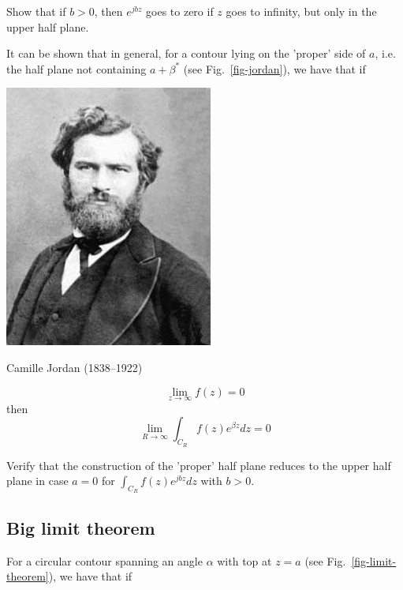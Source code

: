 \begin{cue}
Show that if $b>0$, then $e^{jbz}$ goes to zero if $z$ goes to infinity, but only in the upper half plane.
\end{cue}

It can be shown that in general, for a contour lying on the 'proper' side of $a$, i.e. the half plane not containing $a+\beta^*$ (see Fig.~\ref{fig-jordan}), we have that if

\begin{marginfigure}[-2.5cm]
  \includegraphics{complex/figures/camille_jordan}
  \caption{Camille Jordan (1838–1922) }
\end{marginfigure}

\begin{equation}
\lim_{z \to \infty} f(z) = 0
\end{equation}
then
\begin{equation}
\lim_{R \to \infty} \int_{{C}_R} f(z) e^{\beta z} dz = 0
\end{equation}

\begin{cue}
Verify that the construction of the 'proper' half plane reduces to the upper half plane in case $a=0$ for $ \int_{{C}_R} f(z) e^{jb z} dz$ with $b>0$.
\end{cue}

\subsection*{Big limit theorem}

For a circular contour spanning an angle $\alpha$ with top at $z=a$ (see Fig.~\ref{fig-limit-theorem}), we have that if

